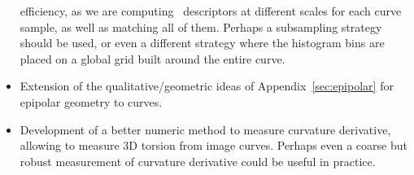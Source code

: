 \begin{itemize}
efficiency, as we are computing \sift\ descriptors at different scales
for each curve sample, as well as matching all of them. Perhaps
a subsampling strategy should be used, or even a different strategy where the
histogram bins are placed on a global grid built around the entire curve.
\item Extension of the qualitative/geometric ideas of
Appendix~\ref{sec:epipolar} for epipolar geometry to curves. 
\item Development of a better numeric method to measure curvature derivative,
allowing to measure 3D torsion from image curves. Perhaps even a coarse but
robust measurement of curvature derivative could be useful in practice.
\end{itemize}

